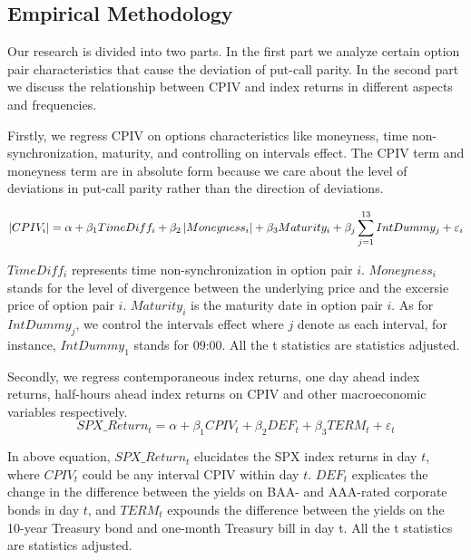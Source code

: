 \subsection{Empirical Methodology}
Our research is divided into two parts. In the first part we analyze certain option pair characteristics that cause the deviation of put-call parity. In the second part we discuss the relationship between CPIV and index returns in different aspects and frequencies. 

Firstly, we regress CPIV on options characteristics like moneyness, time non-synchronization, maturity, and controlling on intervals effect. The CPIV term and moneyness term are in absolute form because we care about the level of deviations in put-call parity rather than the direction of deviations. 

 \begin{equation}\label{eq:char}
 \footnotesize
\left | CPIV _{i} \right| = \alpha  + \beta _{1}TimeDiff_{i} + \beta _{2}\left |Moneyness_{i} \right | + \beta _{3}Maturity_{i} +  \beta _{j} \sum_{j=1}^{13}IntDummy_{j} +\varepsilon _{i}
 \end{equation}

$TimeDiff_{i}$ represents time non-synchronization in option pair $i$. $Moneyness_{i}$ stands for the level of divergence between the underlying price and the excersie price of option pair $i$. $Maturity_{i}$ is the maturity date in option pair $i$. As for $IntDummy_{j} $, we control the intervals effect where $j$ denote as each interval, for instance, $IntDummy_{1}$ stands for 09:00. All the t statistics are \citeauthor{newey1986simple} statistics adjusted. 

Secondly, we regress contemporaneous index returns, one day ahead index returns, half-hours ahead index returns on CPIV and other macroeconomic variables respectively. 
 \begin{equation}  \label{eq:contem}
SPX\_Return_{t} = \alpha + \beta _{1}CPIV_{t} + \beta _{2}DEF_{t} + \beta _{3}TERM_{t} + \varepsilon _{t}
 \end{equation}

In above equation, $SPX\_Return_{t}$ elucidates the SPX index returns in day $t$, where $CPIV_{t}$ could be any interval CPIV within day $t$. $DEF_{t}$ explicates the change in the difference between the yields on BAA- and AAA-rated corporate bonds in day $t$, and $TERM_{t}$ expounds the difference between the yields on the 10-year Treasury bond and one-month Treasury bill in day t. All the t statistics are \citeauthor{newey1986simple} statistics adjusted. 


